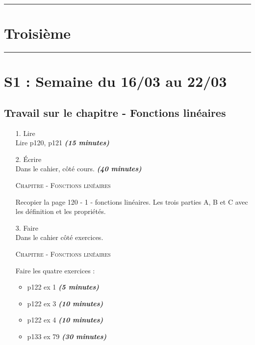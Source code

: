 \documentclass[11pt]{article}
\newcommand{\horrule}[1]{\rule{\linewidth}{#1}} %
\newcommand{\tempsexo}[1]{\textit{\textbf{(#1)}}}
\begin{document}

\newtheorem{Definition}{Définition}
\newtheorem{Theorem}{Théorème}
\newtheorem{Proposition}{Propriété}

\renewcommand{\labelitemi}{$\bullet$}
\renewcommand{\labelitemii}{$\circ$}

\setlength{\columnseprule}{1pt}

\horrule{2px}
\section*{Troisième}
\horrule{2px}

\section{S1 : Semaine du 16/03 au 22/03}

\subsection{Travail sur le chapitre - Fonctions linéaires}

\begin{enumerate}
\item[1.] \huge{Lire} \\ \normalsize 
Lire p120, p121 \tempsexo{15 minutes}

\item[2.] \huge{Écrire} \\ \normalsize 
  Dans le cahier, côté cours. \tempsexo{40 minutes}

	\textsc{Chapitre - Fonctions linéaires}
	
	Recopier la page 120 - 1 - fonctions linéaires. Les trois parties A, B et C avec les définition et les propriétés.

\item[3.] \huge{Faire} \\ \normalsize 
Dans le cahier côté exercices. 

	\textsc{Chapitre - Fonctions linéaires}
	
	Faire les quatre exercices :
	\begin{itemize}
  \item p122 ex 1 \tempsexo{5 minutes}
	\item p122 ex 3 \tempsexo{10 minutes}
	\item p122 ex 4 \tempsexo{10 minutes}
	\item p133 ex 79 \tempsexo{30 minutes}
  \end{itemize}

\end{enumerate}		
\end{document}
